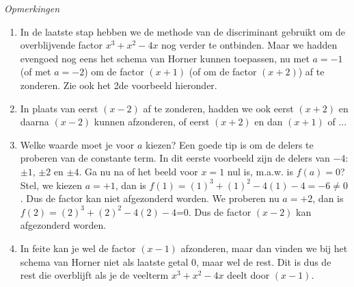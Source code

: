 \begin{voorbeeld}
\emph{Opmerkingen}
\begin{enumerate}
	\item In de laatste stap hebben we de methode van de discriminant gebruikt om de overblijvende factor $x^3+x^2-4x$ nog verder te ontbinden. Maar we hadden evengoed nog eens het schema van Horner kunnen toepassen, nu met $a=-1$ (of met $a=-2$) om de factor $(x+1)$ (of om de factor $(x+2)$) af te zonderen. Zie ook het 2de voorbeeld hieronder.
	\item In plaats van eerst $(x-2)$ af te zonderen, hadden we ook eerst $(x+2)$ en daarna $(x-2)$ kunnen afzonderen, of eerst $(x+2)$ en dan $(x+1)$ of ...
	\item Welke waarde moet je voor $a$ kiezen? Een goede tip is om de delers te proberen van de constante term. In dit eerste voorbeeld zijn de delers van $-4$: $\pm1$, $\pm2$ en $\pm4$. Ga nu na of het beeld voor $x=1$ nul is, m.a.w. is $f(a)=0$? Stel, we kiezen $a=+1$, dan is $f(1)=(1)^3+(1)^2-4(1)-4=-6\ne 0$. Dus de factor  kan niet afgezonderd worden. We proberen nu $a=+2$, dan is $f(2)=(2)^3+(2)^2-4(2)-4$=0. Dus de factor $(x-2)$ kan afgezonderd worden.
	\item In feite kan je wel de factor $(x-1)$ afzonderen, maar dan vinden we bij het schema van Horner niet als laatste getal 0, maar wel de rest. Dit is dus de rest die overblijft als je de veelterm $x^3+x^2-4x$ deelt door $(x-1)$.
\end{enumerate}

\end{voorbeeld}


